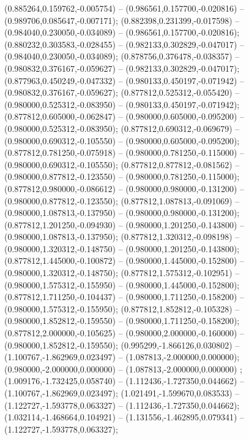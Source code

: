  (0.885264,0.159762,-0.005754) -- (0.986561,0.157700,-0.020816) -- (0.989706,0.085647,-0.007171);
 (0.882398,0.231399,-0.017598) -- (0.984040,0.230050,-0.034089) -- (0.986561,0.157700,-0.020816);
 (0.880232,0.303583,-0.028455) -- (0.982133,0.302829,-0.047017) -- (0.984040,0.230050,-0.034089);
 (0.878756,0.376478,-0.038357) -- (0.980832,0.376167,-0.059627) -- (0.982133,0.302829,-0.047017);
 (0.877963,0.450249,-0.047332) -- (0.980133,0.450197,-0.071942) -- (0.980832,0.376167,-0.059627);
 (0.877812,0.525312,-0.055420) -- (0.980000,0.525312,-0.083950) -- (0.980133,0.450197,-0.071942);
 (0.877812,0.605000,-0.062847) -- (0.980000,0.605000,-0.095200) -- (0.980000,0.525312,-0.083950);
 (0.877812,0.690312,-0.069679) -- (0.980000,0.690312,-0.105550) -- (0.980000,0.605000,-0.095200);
 (0.877812,0.781250,-0.075918) -- (0.980000,0.781250,-0.115000) -- (0.980000,0.690312,-0.105550);
 (0.877812,0.877812,-0.081562) -- (0.980000,0.877812,-0.123550) -- (0.980000,0.781250,-0.115000);
 (0.877812,0.980000,-0.086612) -- (0.980000,0.980000,-0.131200) -- (0.980000,0.877812,-0.123550);
 (0.877812,1.087813,-0.091069) -- (0.980000,1.087813,-0.137950) -- (0.980000,0.980000,-0.131200);
 (0.877812,1.201250,-0.094930) -- (0.980000,1.201250,-0.143800) -- (0.980000,1.087813,-0.137950);
 (0.877812,1.320312,-0.098198) -- (0.980000,1.320312,-0.148750) -- (0.980000,1.201250,-0.143800);
 (0.877812,1.445000,-0.100872) -- (0.980000,1.445000,-0.152800) -- (0.980000,1.320312,-0.148750);
 (0.877812,1.575312,-0.102951) -- (0.980000,1.575312,-0.155950) -- (0.980000,1.445000,-0.152800);
 (0.877812,1.711250,-0.104437) -- (0.980000,1.711250,-0.158200) -- (0.980000,1.575312,-0.155950);
 (0.877812,1.852812,-0.105328) -- (0.980000,1.852812,-0.159550) -- (0.980000,1.711250,-0.158200);
 (0.877812,2.000000,-0.105625) -- (0.980000,2.000000,-0.160000) -- (0.980000,1.852812,-0.159550);
 (0.995299,-1.866126,0.030802) -- (1.100767,-1.862969,0.023497) -- (1.087813,-2.000000,0.000000);
 (0.980000,-2.000000,0.000000) -- (1.087813,-2.000000,0.000000) ;
 (1.009176,-1.732425,0.058740) -- (1.112436,-1.727350,0.044662) -- (1.100767,-1.862969,0.023497);
 (1.021491,-1.599670,0.083533) -- (1.122727,-1.593778,0.063327) -- (1.112436,-1.727350,0.044662);
 (1.032114,-1.468664,0.104921) -- (1.131556,-1.462895,0.079341) -- (1.122727,-1.593778,0.063327);
